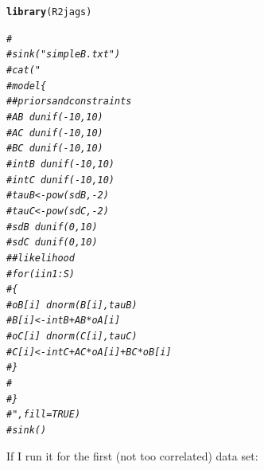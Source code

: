 \documentclass{article}\usepackage[]{graphicx}\usepackage[]{color}
\makeatletter
\newcommand{\hlcom}[1]{\textcolor[rgb]{0.678,0.584,0.686}{\textit{#1}}}%
\newcommand{\hlstd}[1]{\textcolor[rgb]{0.345,0.345,0.345}{#1}}%
\newcommand{\hlkwd}[1]{\textcolor[rgb]{0.737,0.353,0.396}{\textbf{#1}}}%
\newenvironment{kframe}{%
 \def\at@end@of@kframe{}%
 \ifinner\ifhmode%
  \def\at@end@of@kframe{\end{minipage}}%
  \begin{minipage}{\columnwidth}%
 \fi\fi%
 \def\FrameCommand##1{\hskip\@totalleftmargin \hskip-\fboxsep
 \colorbox{shadecolor}{##1}\hskip-\fboxsep
     \hskip-\linewidth \hskip-\@totalleftmargin \hskip\columnwidth}%
 \MakeFramed {\advance\hsize-\width
   \@totalleftmargin\z@ \linewidth\hsize
   \@setminipage}}%
 {\par\unskip\endMakeFramed%
 \at@end@of@kframe}
\newenvironment{knitrout}{}{} %
\makeatother
\begin{document}
\begin{knitrout}
\color{fgcolor}\begin{kframe}
\begin{alltt}
\hlkwd{library}\hlstd{(R2jags)}
\end{alltt}


{\ttfamily\noindent\itshape\color{messagecolor}{\#\# Loading required package: rjags\\\#\# Loading required package: coda\\\#\# Loading required package: lattice\\\#\# Linked to JAGS 3.4.0\\\#\# Loaded modules: basemod,bugs\\\#\# \\\#\# Attaching package: 'R2jags'\\\#\# \\\#\# The following object is masked from 'package:coda':\\\#\# \\\#\#\ \ \ \  traceplot}}\begin{alltt}
\hlcom{# }
\hlcom{# sink("simpleB.txt")}
\hlcom{# cat("}
\hlcom{#     model \{}
\hlcom{#     #priors and constraints}
\hlcom{#     AB~dunif(-10,10)}
\hlcom{#     AC~dunif(-10,10)}
\hlcom{#     BC~dunif(-10,10)}
\hlcom{#     intB~dunif(-10,10)}
\hlcom{#     intC~dunif(-10,10)}
\hlcom{#     tauB<-pow(sdB,-2)}
\hlcom{#     tauC<-pow(sdC,-2)}
\hlcom{#     sdB~dunif(0,10)}
\hlcom{#     sdC~dunif(0,10)}
\hlcom{#     #likelihood}
\hlcom{#     for (i in 1:S)    }
\hlcom{#       \{}
\hlcom{#         oB[i]~dnorm(B[i],tauB)}
\hlcom{#         B[i]<-intB+AB*oA[i]}
\hlcom{#         oC[i]~dnorm(C[i],tauC)}
\hlcom{#         C[i]<-intC+AC*oA[i]+BC*oB[i]}
\hlcom{#       \}}
\hlcom{# }
\hlcom{#     \}}
\hlcom{#     ",fill = TRUE)}
\hlcom{# sink()}
\end{alltt}
\end{kframe}
\end{knitrout}

If I run it for the first (not too correlated) data set:
\end{document}

